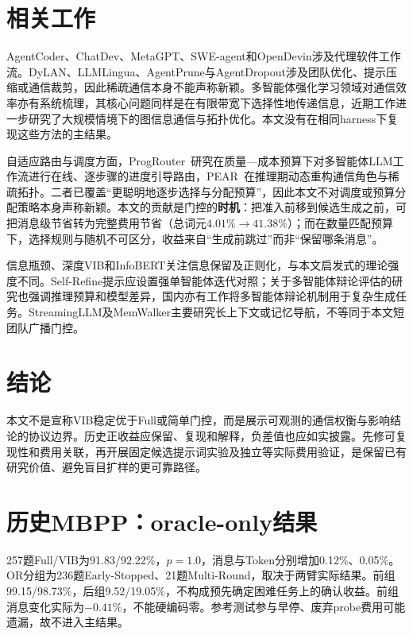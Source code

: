 \documentclass[11pt,a4paper]{article}
\begin{document}
\section{相关工作}
AgentCoder、ChatDev、MetaGPT、SWE-agent和OpenDevin涉及代理软件工作流\citep{du2023agentcoder,qian2023chatdev,hong2023metagpt,yang2024sweagent,wang2024opendevin}。DyLAN、LLMLingua、AgentPrune与AgentDropout涉及团队优化、提示压缩或通信裁剪\citep{liu2023dylan,jiang2023llmlingua,zhang2024agentprune,wang2025agentdropout}，因此稀疏通信本身不能声称新颖。多智能体强化学习领域对通信效率亦有系统梳理，其核心问题同样是在有限带宽下选择性地传递信息\citep{chen2026communication}，近期工作进一步研究了大规模情境下的图信息通信与拓扑优化\citep{li2026graphinfo}。本文没有在相同harness下复现这些方法的主结果。

自适应路由与调度方面，ProgRouter~\citep{li2026progrouter}研究在质量—成本预算下对多智能体LLM工作流进行在线、逐步骤的进度引导路由，PEAR~\citep{feng2026pear}在推理期动态重构通信角色与稀疏拓扑。二者已覆盖“更聪明地逐步选择与分配预算”，因此本文不对调度或预算分配策略本身声称新颖。本文的贡献是门控的\textbf{时机}：把准入前移到候选生成之前，可把消息级节省转为完整费用节省（总词元$4.01\%\rightarrow41.38\%$）；而在数量匹配预算下，选择规则与随机不可区分，收益来自“生成前跳过”而非“保留哪条消息”。

信息瓶颈、深度VIB和InfoBERT关注信息保留及正则化\citep{tishby2015deep,alemi2017variational,wang2021infobert}，与本文启发式的理论强度不同。Self-Refine提示应设置强单智能体迭代对照\citep{madaan2023selfrefine}；关于多智能体辩论评估的研究也强调推理预算和模型差异\citep{zhang2025stopovervaluing}，国内亦有工作将多智能体辩论机制用于复杂生成任务\citep{ma2026debate}。StreamingLLM及MemWalker主要研究长上下文或记忆导航\citep{xiao2023streamingllm,liu2024memwalker}，不等同于本文短团队广播门控。

\section{结论}
本文不是宣称VIB稳定优于Full或简单门控，而是展示可观测的通信权衡与影响结论的协议边界。历史正收益应保留、复现和解释，负差值也应如实披露。先修可复现性和费用关联，再开展固定候选提示词实验及独立等实际费用验证，是保留已有研究价值、避免盲目扩样的更可靠路径。

\clearpage
\appendix
\section{历史MBPP：oracle-only结果}\label{app:gate_trace}
257题Full/VIB为91.83/92.22\%，$p=1.0$，消息与Token分别增加0.12\%、0.05\%。OR分组为236题Early-Stopped、21题Multi-Round，取决于两臂实际结果。前组99.15/98.73\%，后组9.52/19.05\%，不构成预先确定困难任务上的确认收益。前组消息变化实际为$-0.41\%$，不能硬编码零。参考测试参与早停、废弃probe费用可能遗漏，故不进入主结果。
\end{document}
